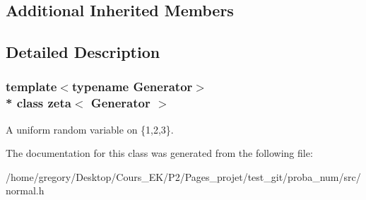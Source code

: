 \subsection*{Additional Inherited Members}


\subsection{Detailed Description}
\subsubsection*{template$<$typename Generator$>$\\*
class zeta$<$ Generator $>$}

A uniform random variable on \{1,2,3\}. 

The documentation for this class was generated from the following file\+:\begin{DoxyCompactItemize}
\item 
/home/gregory/\+Desktop/\+Cours\+\_\+\+E\+K/\+P2/\+Pages\+\_\+projet/test\+\_\+git/proba\+\_\+num/src/normal.\+h\end{DoxyCompactItemize}

